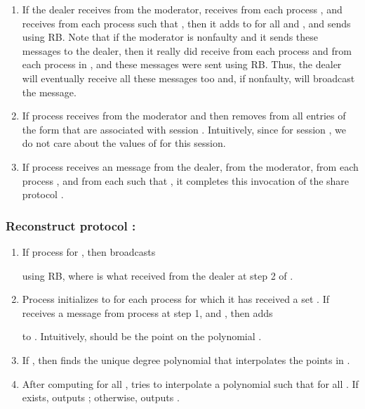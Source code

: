 \documentclass{sig-alternate}
\begin{document}
\begin{enumerate}
\item If the dealer  receives  from the moderator,
receives  from  each process ,
and receives  from each process  such
that , then
it adds   to 
for all  and , and sends 
using RB.
Note that if the moderator is nonfaulty and it sends these messages to
the dealer, then it really did receive
 from each process 
and  from each process  in , and these
messages were sent
using RB.  Thus, the dealer will eventually receive all these
messages too and, if nonfaulty, will broadcast the  message.


\item If process  receives  from the moderator and  then 
 removes from  all entries of the form  that
are associated with session . Intuitively, since 
 for session , we do not care about the values
of  for this session. 



\item If process  receives an  message from the dealer,
 from the moderator,  from each
process , and  from each  such that
, it completes
this invocation of the share protocol .



\end{enumerate}

\subsubsection*{Reconstruct protocol :}

\begin{enumerate}
\item
If process  for , then  broadcasts

using RB, where  is what  received from the dealer at
step 2 of .

\item
Process  initializes  to   for each process
 for which it has received a set .
If  receives a message  from
process  at step 1, and  , then  adds

to .
Intuitively,  should be the point
 on the polynomial .

\item
If , then 
finds the unique degree  polynomial
 that interpolates the points in .


\item After computing  for all , 
tries to interpolate a polynomial 
such that  for all .
If  exists,  outputs ;
otherwise,  outputs .
\end{enumerate}
\end{document}
